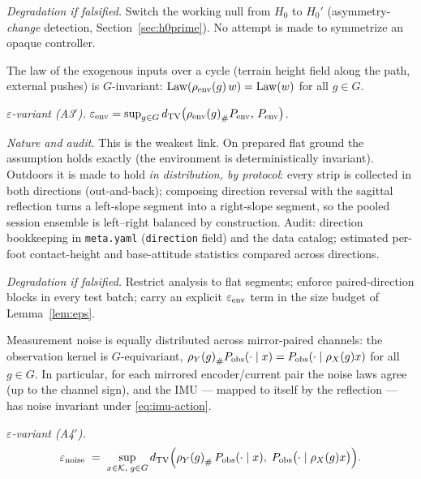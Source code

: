 \emph{Degradation if falsified.} Switch the working null from $H_0$ to
$H_0'$ (asymmetry-\emph{change} detection, Section~\ref{sec:h0prime}). No
attempt is made to symmetrize an opaque controller.

\begin{assumption}
\label{as:env}
The law of the exogenous inputs over a cycle (terrain height field along the
path, external pushes) is $G$-invariant:
$\operatorname{Law}(\rho_{\mathrm{env}}(g)\, w) = \operatorname{Law}(w)$ for all $g \in G$.
\end{assumption}

\emph{$\varepsilon$-variant (A3$'$).}
$\varepsilon_{\mathrm{env}} = \sup_{g \in G} d_{\mathrm{TV}}\bigl({\rho_{\mathrm{env}}(g)}_{\#} P_{\mathrm{env}},\,
P_{\mathrm{env}}\bigr)$.

\emph{Nature and audit.} This is the weakest link. On prepared flat ground the
assumption holds exactly (the environment is deterministically invariant).
Outdoors it is made to hold \emph{in distribution, by protocol}: every strip
is collected in both directions (out-and-back); composing direction reversal
with the sagittal reflection turns a left-slope segment into a right-slope
segment, so the pooled session ensemble is left--right balanced by
construction. Audit: direction bookkeeping in \texttt{meta.yaml}
(\texttt{direction} field) and the data catalog; estimated per-foot
contact-height and base-attitude statistics compared across directions.

\emph{Degradation if falsified.} Restrict analysis to flat segments; enforce
paired-direction blocks in every test batch; carry an explicit $\varepsilon_{\mathrm{env}}$
term in the size budget of Lemma~\ref{lem:eps}.

\begin{assumption}
\label{as:noise}
Measurement noise is equally distributed across mirror-paired channels: the
observation kernel is $G$-equivariant,
${\rho_{Y}(g)}_{\#} P_{\mathrm{obs}}(\cdot \mid x)
= P_{\mathrm{obs}}(\cdot \mid \rho_{X}(g) x)$ for all $g \in G$. In particular,
for each mirrored encoder/current pair the noise laws agree (up to the channel
sign), and the IMU --- mapped to itself by the reflection --- has noise
invariant under \eqref{eq:imu-action}.
\end{assumption}

\emph{$\varepsilon$-variant (A4$'$).}
\[
  \varepsilon_{\mathrm{noise}}
  \;=\;
  \sup_{x \in \mathcal{K},\; g \in G}
  d_{\mathrm{TV}}\Bigl(
    {\rho_{Y}(g)}_{\#}\, P_{\mathrm{obs}}(\cdot \mid x),\;
    P_{\mathrm{obs}}\bigl(\cdot \mid \rho_{X}(g)x\bigr)
  \Bigr) .
\]

